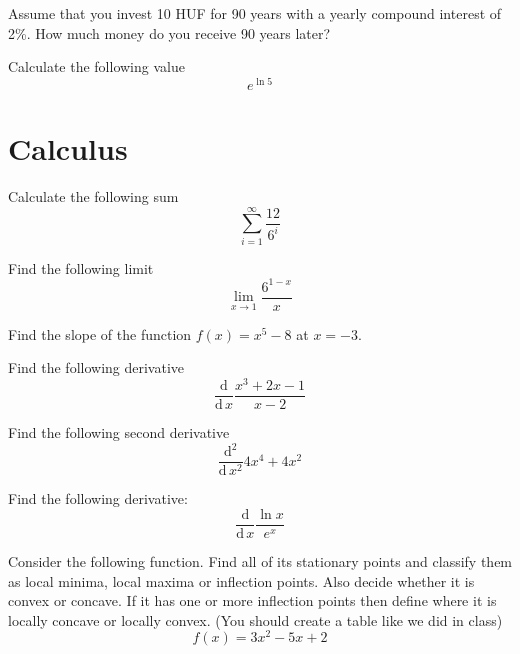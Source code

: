 \documentclass[10pt]{article}
\newenvironment{problem}[2][Problem]{\begin{trivlist}
\item[\hskip \labelsep {\bfseries #1}\hskip \labelsep {\bfseries #2.}]}{\end{trivlist}}
\begin{document}
\begin{problem}{2.4}
Assume that you invest 10 HUF for 90 years with a yearly compound interest of 2\%. How much money do you receive 90 years later?
\end{problem}

\begin{problem}{2.5}
Calculate the following value
$$e^{\ln 5}$$
\end{problem}

\section{Calculus}

\begin{problem}{3.1}
Calculate the following sum
$$\sum\limits_{i=1}^{\infty} \frac{12}{6^i}$$
\end{problem}

\begin{problem}{3.2}
Find the following limit
$$\lim\limits_{x \rightarrow 1}\frac{6^{1-x}}{x}$$
\end{problem}

\begin{problem}{3.3}
Find the slope of the function $f(x)=x^5-8$ at $x=-3$.
\end{problem}

\begin{problem}{3.4}
Find the following derivative
$$\frac{\mathrm{d}}{\mathrm{d}\, x} \frac{x^3+2x-1}{x-2}$$
\end{problem}

\begin{problem}{3.5}
Find the following second derivative
 $$\frac{\mathrm{d^2}}{\mathrm{d}\, x^2} 4x^4+4x^2$$
\end{problem}

\begin{problem}{3.6}
Find the following derivative:
$$\frac{\mathrm{d}}{\mathrm{d}\, x} \frac{\ln x}{e^x}$$
\end{problem}

\begin{problem}{3.7}
Consider the following function. Find all of its stationary points and classify them as local minima, local maxima or inflection points. Also decide whether it is convex or concave. If it has one or more inflection points then define where it is locally concave or locally convex. (You should create a table like we did in class)
$$f(x)=3x^2-5x+2$$
\end{problem}
\end{document}
